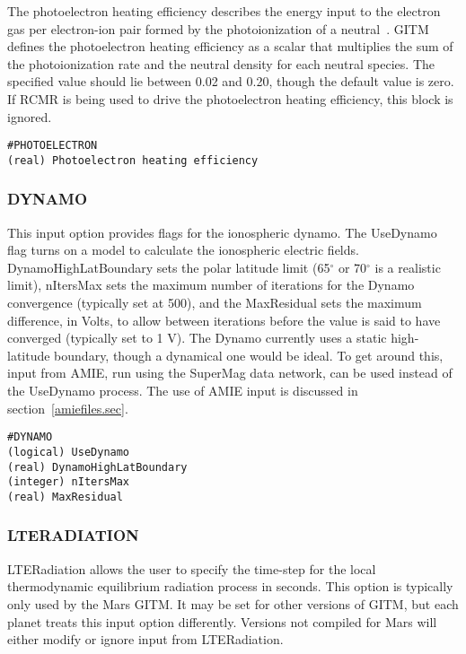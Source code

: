 The photoelectron heating efficiency describes the energy input to the electron gas per electron-ion pair formed by the photoionization of a neutral~\citep{Hanson:1968ue}.  GITM defines the photoelectron heating efficiency as a scalar that multiplies the sum of the photoionization rate and the neutral density for each neutral species.  The specified value should lie between 0.02 and 0.20, though the default value is zero.  If RCMR is being used to drive the photoelectron heating efficiency, this block is ignored.

\begin{verbatim}
#PHOTOELECTRON
(real) Photoelectron heating efficiency
\end{verbatim}

\subsubsection{DYNAMO}
\label{dynamo.sec}

This input option provides flags for the ionospheric dynamo.  The UseDynamo flag turns on a model to calculate the ionospheric electric fields.  DynamoHighLatBoundary sets the polar latitude limit (65$^\circ$ or 70$^\circ$ is a realistic limit), nItersMax sets the maximum number of iterations for the Dynamo convergence (typically set at 500), and the MaxResidual sets the maximum difference, in Volts, to allow between iterations before the value is said to have converged (typically set to 1 V).  The Dynamo currently uses a static high-latitude boundary, though a dynamical one would be ideal.  To get around this, input from AMIE, run using the SuperMag data network, can be used instead of the UseDynamo process.  The use of AMIE input is discussed in section~\ref{amiefiles.sec}.

\begin{verbatim}
#DYNAMO
(logical) UseDynamo   
(real) DynamoHighLatBoundary 
(integer) nItersMax        
(real) MaxResidual     
\end{verbatim}

\subsubsection{LTERADIATION}
\label{lteradiation.sec}

LTERadiation allows the user to specify the time-step for the local thermodynamic equilibrium radiation process in seconds.  This option is typically only used by the Mars GITM.  It may be set for other versions of GITM, but each planet treats this input option differently.  Versions not compiled for Mars will either modify or ignore input from LTERadiation.


